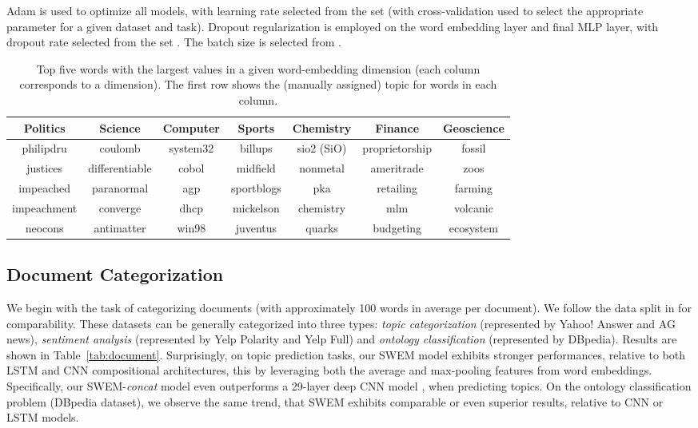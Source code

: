 \documentclass[11pt,a4paper]{article}
\begin{document}
Adam \citep{kingma2014adam} is used to optimize all models, with learning rate selected from the set  (with cross-validation used to select the appropriate parameter for a given dataset and task).
Dropout regularization \citep{srivastava2014dropout} is employed on the word embedding layer and final MLP layer, with dropout rate selected from the set .
The batch size is selected from .


\begin{table*}[t!]
\centering 
\def\arraystretch{1.1}
	\begin{small}
		\begin{tabular}{c|c|c|c|c|c|c}
\toprule[1.2pt]
			\textbf{Politics} & \textbf{Science} & \textbf{Computer} & \textbf{Sports} & \textbf{Chemistry} & \textbf{Finance} & \textbf{Geoscience}  \\
			\hline
			philipdru & coulomb & system32 & billups & sio2 (SiO) & proprietorship & fossil  \\
justices & differentiable & cobol & midfield & nonmetal & ameritrade & zoos \\
impeached & paranormal & agp & sportblogs & pka & retailing & farming \\
impeachment & converge & dhcp & mickelson  & chemistry & mlm & volcanic  \\
neocons & antimatter & win98 & juventus & quarks & budgeting & ecosystem  \\
\bottomrule[1.2pt]
		\end{tabular}
		\caption{Top five words with the largest values in a given word-embedding dimension (each column corresponds to a dimension). The first row shows the (manually assigned) topic for words in each column.}
		\label{tab:similar}
	\end{small}
	\vspace{-3mm}
\end{table*}

\subsection{Document Categorization}
We begin with the task of categorizing documents (with approximately 100 words in average per document).
We follow the data split in \citet{zhang2015character} for comparability.
These datasets can be generally categorized into three types: \emph{topic categorization} (represented by Yahoo! Answer and AG news), \emph{sentiment analysis} (represented by Yelp Polarity and Yelp Full) and \emph{ontology classification} (represented by DBpedia).
Results are shown in Table~\ref{tab:document}.
Surprisingly, on topic prediction tasks, our SWEM model exhibits stronger performances, relative to both LSTM and CNN compositional architectures, this by leveraging both the average and max-pooling features from word embeddings.
Specifically, our SWEM-\emph{concat} model even outperforms a 29-layer deep CNN model \citep{conneau2016very}, when predicting topics.
On the ontology classification problem (DBpedia dataset), we observe the same trend, that SWEM exhibits comparable or even superior results, relative to CNN or LSTM models.
\end{document}
